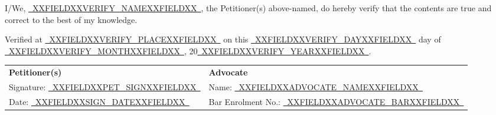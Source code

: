 \documentclass[12pt,a4paper]{article}
\newcommand{\fillline}[1]{\underline{~#1~}}
\begin{document}
\noindent I/We, \fillline{XXFIELDXXVERIFY_NAMEXXFIELDXX}, the Petitioner(s) above-named, do
hereby verify that the contents are true and correct to the best of my knowledge.

\vspace{0.5em}

\noindent Verified at \fillline{XXFIELDXXVERIFY_PLACEXXFIELDXX} on this \fillline{XXFIELDXXVERIFY_DAYXXFIELDXX}
day of \fillline{XXFIELDXXVERIFY_MONTHXXFIELDXX}, 20\fillline{XXFIELDXXVERIFY_YEARXXFIELDXX}.

\vspace{2em}

\noindent
\begin{tabularx}{\textwidth}{@{}X X@{}}
    \textbf{Petitioner(s)} & \textbf{Advocate}\\[1.5em]
    Signature: \fillline{XXFIELDXXPET_SIGNXXFIELDXX} & Name: \fillline{XXFIELDXXADVOCATE_NAMEXXFIELDXX}\\[0.5em]
    Date: \fillline{XXFIELDXXSIGN_DATEXXFIELDXX} & Bar Enrolment No.: \fillline{XXFIELDXXADVOCATE_BARXXFIELDXX}\\
\end{tabularx}
\end{document}
